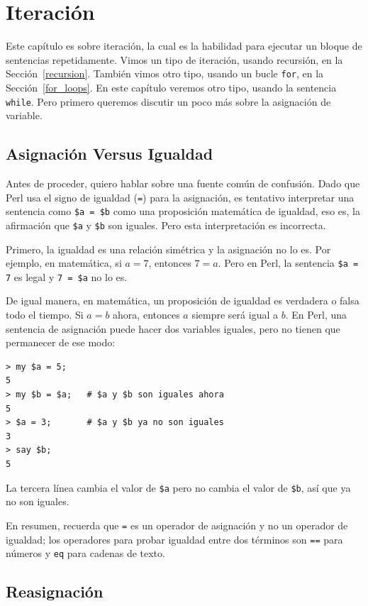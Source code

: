 
\chapter{Iteración}
\label{iteration}

Este capítulo es sobre iteración, la cual es la habilidad
para ejecutar un bloque de sentencias repetidamente. Vimos
un tipo de iteración, usando recursión, en la Sección~\ref{recursion}.
También vimos otro tipo, usando un bucle {\tt for}, en la
Sección~\ref{for_loops}. En este capítulo veremos otro tipo, 
usando la sentencia {\tt while}. Pero primero queremos discutir
un poco más sobre la asignación de variable.

\section{Asignación Versus Igualdad}

Antes de proceder, quiero hablar sobre una fuente común de confusión.
Dado que Perl usa el signo de igualdad ({\tt =}) para la asignación, 
es tentativo interpretar una sentencia como {\tt \$a = \$b} como 
una proposición matemática de igualdad, eso es, la afirmación que 
{\tt \$a} y {\tt \$b} son iguales. Pero esta interpretación es incorrecta.

Primero, la igualdad es una relación simétrica y la asignación no lo es. 
Por ejemplo, en matemática, si $a = 7$, entonces $7 = a$. Pero en Perl, 
la sentencia {\tt \$a = 7} es legal y {\tt 7 = \$a} no lo es.

De igual manera, en matemática, un proposición de igualdad es verdadera
o falsa todo el tiempo. Si $a = b$ ahora, entonces $a$ siempre será igual
a $b$. En Perl, una sentencia de asignación puede hacer dos variables iguales,
pero no tienen que permanecer de ese modo:

\begin{lstlisting}
> my $a = 5;
5
> my $b = $a;   # $a y $b son iguales ahora
5
> $a = 3;       # $a y $b ya no son iguales
3
> say $b;
5
\end{lstlisting}
%
La tercera línea cambia el valor de {\tt \$a} pero no cambia el 
valor de {\tt \$b}, así que ya no son iguales.

En resumen, recuerda que {\tt =} es un operador de asignación y
no un operador de igualdad; los operadores para probar igualdad entre
dos términos son {\tt ==} para números y {\tt eq} para cadenas de 
texto.
\section{Reasignación}

